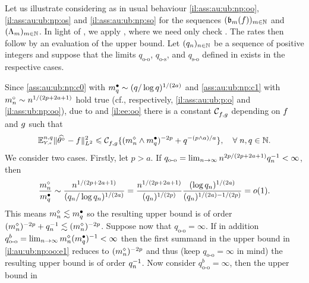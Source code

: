 \begin{il}\label{IL_FREQ_CIRCDECONV_UNKNOWN_IID_ORACLE_NP}
Let us illustrate   considering as in  usual
  behaviour  \ref{il:ass:au:ub:np:oo}, \ref{il:ass:au:ub:np:os} and \ref{il:ass:au:ub:np:so}
 for the sequences $\Nsuite[\Di]{\bias[\Di](\xdf)}$ and
  $\Nsuite[\Di]{\iSv[\Di]}$. In light of , we
  apply , where  we need only check . The rates then follow by an evaluation of the upper bound. Let
  $\Nsuite[\ssY]{\ssE_{\ssY}}$ be a sequence of positive integers and
  suppose that the limits  $q_{\text{o-o}}$, $q_{\text{o-s}}$, and
$q_{\text{s-o}}$  defined in  exists in the respective cases.
\begin{Liste}[]
\item[\mylabel{il:au:ub:np:oo}{\dg\bfseries{[o-o]}}] 
Since  \ref{ass:au:ub:np:c0} with $\sDi{\ssE}\sim
(\ssE/\log\ssE)^{1/(2a)}$ and \ref{ass:au:ub:np:c1} with
$\oDi{\ssY}\sim \ssY^{1/(2p+2a+1)}$ hold true
(cf., respectively,  \ref{il:ass:au:ub:p:o} and
 \ref{il:ass:ub:np:oo}), due to
 and  \ref{il:ee:oo}
there is a constant $\cst{\xdf,\edf}$ depending on $\xdf$ and $\edf$
such that
\begin{equation}\label{il:au:ub:np:oo:e1}\FuEx[\ssY,\ssE]{\rY,\rE}\VnormLp{\hxdf-\xdf}^2\leq\cst{\xdf,\edf}\{(\aDi{\ssY}\wedge\sDi{\ssE})^{-2p}+\ssE^{-(p\wedge
    a)/a}\},\quad\forall\;\ssY,\ssE\in\Nz.\end{equation} 
We consider two cases. Firstly, let $p> a$. If
$q_{\text{o-o}}=\lim_{\ssY\to\infty}\ssY^{2p/(2p+2a+1)}\ssE_{\ssY}^{-1}<\infty$,
then
\begin{equation*}
\frac{\aDi{\ssY}}{\sDi{\ssE}}\sim\frac{\ssY^{1/(2p+2a+1)}}{(\ssE_{\ssY}/\log\ssE_{\ssY})^{1/(2a)}}=\frac{\ssY^{1/(2p+2a+1)}}{(\ssE_{\ssY})^{1/(2p)}}\frac{(\log\ssE_{\ssY})^{1/(2a)}}{(\ssE_{\ssY})^{1/(2a)-1/(2p)}}=o(1).
\end{equation*}
This means $\aDi{\ssY}\lesssim\sDi{\ssE}$ so the resulting upper bound
is of order
$(\aDi{\ssY})^{-2p}+\ssE_{\ssY}^{-1}\lesssim(\aDi{\ssY})^{-2p}$. Suppose
now that $q_{\text{o-o}}=\infty$. If in addition
$q^b_{\text{o-o}}=\lim_{\ssY\to\infty}\aDi{\ssY}(\sDi{\ssE})^{-1}<\infty$
then the first summand in the upper bound in \eqref{il:au:ub:np:oo:e1}
reduces to $(\aDi{\ssY})^{-2p}$ and thus (keep $q_{\text{o-o}}=\infty$
in mind) the resulting upper bound
is of order $\ssE_{\ssY}^{-1}$. Now consider
$q^b_{\text{o-o}}=\infty$, then   the upper bound in

\end{Liste}
\end{il}
